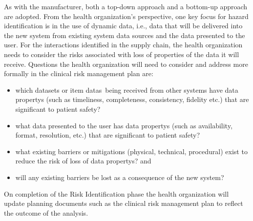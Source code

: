 As with the manufacturer, both a top-down approach and a bottom-up approach are adopted. From the health organization's perspective, one key focus for \gls{hazard} identification is in the use of dynamic data, i.e., data that will be delivered into the new system from existing system data sources and the data presented to the user. For the interactions identified in the supply chain, the health organization needs to consider the risks associated with loss of properties of the data it will receive. Questions the health organization will need to consider and address more formally in the clinical risk management plan are:
\clearpage%
\begin{itemize}
  \item which \glspl{dataset} or \glspl{item data}\ being received from other systems have \glspl{data property} (such as \gls{timeliness}, \gls{completeness}, \gls{consistency}, \gls{fidelity} etc.) that are significant to patient safety? 
  \item what data presented to the user has \glspl{data property} (such as \gls{availability}, format, \gls{resolution}, etc.) that are significant to patient safety?
  \item what existing barriers or \glspl{mitigation} (physical, technical, procedural) exist to reduce the risk of loss of \glspl{data property}? and
  \item will any existing barriers be lost as a consequence of the new system?
\end{itemize}

On completion of the Risk Identification phase the health organization will update planning documents such as the clinical risk management plan to reflect the outcome of the analysis.

